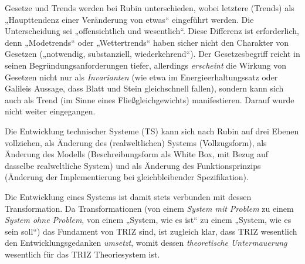 \documentclass[a4paper,11pt]{article}
\begin{document}
Gesetze und Trends werden bei Rubin unterschieden, wobei letztere (Trends) als
„Haupttendenz einer Veränderung von etwas“ eingeführt werden.  Die
Unterscheidung sei „offensichtlich und wesentlich“.  Diese Differenz ist
erforderlich, denn „Modetrends“ oder „Wettertrends“ haben sicher nicht den
Charakter von Gesetzen („notwendig, substanziell, wiederkehrend“). Der
Gesetzesbegriff reicht in seinen Begründungsanforderungen tiefer, allerdings
\emph{erscheint} die Wirkung von Gesetzen nicht nur als \emph{Invarianten}
(wie etwa im Energieerhaltungssatz oder Galileis Aussage, dass Blatt und Stein
gleichschnell fallen), sondern kann sich auch als Trend (im Sinne eines
Fließgleichgewichts) manifestieren.  Darauf wurde nicht weiter eingegangen.

Die Entwicklung technischer Systeme (TS) kann sich nach Rubin auf drei Ebenen
vollziehen, als Änderung des (realweltlichen) Systems (Vollzugsform), als
Änderung des Modells (Beschreibungsform als White Box, mit Bezug auf dasselbe
realweltliche System) und als Änderung des Funktionsprinzips (Änderung der
Implementierung bei gleichbleibender Spezifikation).

Die Entwicklung eines Systems ist damit stets verbunden mit dessen
Transformation.  Da Transformationen (von einem \emph{System mit Problem} zu
einem \emph{System ohne Problem}, von einem „System, wie es ist“ zu einem
„System, wie es sein soll“) das Fundament von TRIZ sind, ist zugleich klar,
dass TRIZ wesentlich den Entwicklungsgedanken \emph{umsetzt}, womit dessen
\emph{theoretische Untermauerung} wesentlich für das TRIZ Theoriesystem ist.
\end{document}

